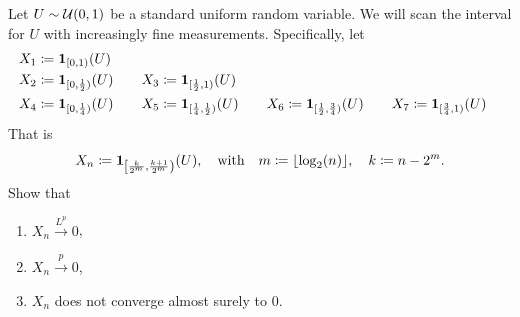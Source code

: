 
\begin{exercise}[subtitle={Convergence in \(L^p\) but not almost surely \Coffeecup\Coffeecup}] 
    \label{ex: convergence in Lp but not as}
    Let \(U\sim \mathcal{U}(0,1)\) be a standard uniform random variable.
    We will scan the interval for \(U\) with increasingly fine measurements. Specifically,
    let
    \begin{alignat*}{7}
        X_1 &\coloneq \ind{[0,1)}(U)
        \\
        X_2 &\coloneq \ind{[0,\frac12)}(U)
        \quad & X_3 &\coloneq \ind{[\frac12, 1)}(U)
        \\
        X_4 &\coloneq \ind{[0, \frac14)}(U)
        \quad & X_5 &\coloneq \ind{[\frac14, \frac12)}(U)
        \quad & X_6 &\coloneq \ind{[\frac12, \frac34)}(U)
        \quad & X_7 &\coloneq \ind{[\frac34, 1)}(U)
    \end{alignat*}
    That is
    \[
        X_n \coloneq \ind{\left[
            \frac{k}{2^{m}}, \frac{k+1}{2^{m}}
        \right)}(U),
        \quad \text{with}\quad 
        m \coloneq \lfloor\log_2(n)\rfloor, \quad k \coloneq n - 2^m. 
    \]
    Show that
    \begin{enumerate}[label=(\alph*), noitemsep]
        \item\label{it: (conv in Lp but not as) in Lp}
        \(X_n \xrightarrow{L^p} 0\),

        \item\label{it: (conv in Lp but not as) in prob}
        \(X_n \xrightarrow{p} 0\),

        \item\label{it: (conv in Lp but not as) not as}
        \(X_n\) does not converge almost surely to \(0\).
    \end{enumerate}
\end{exercise}
